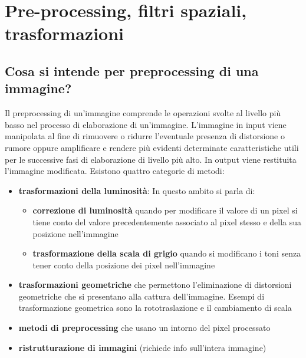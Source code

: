\chapter{Pre-processing, filtri spaziali, trasformazioni}

\section{Cosa si intende per preprocessing di una immagine?}
Il preprocessing di un'immagine comprende le operazioni svolte al livello più basso nel processo di elaborazione di un'immagine. L'immagine in input viene manipolata al fine di rimuovere o ridurre l'eventuale presenza di distorsione o rumore oppure amplificare e rendere più evidenti determinate caratteristiche utili per le successive fasi di elaborazione di livello più alto. In output viene restituita l'immagine modificata. Esistono quattro categorie di metodi:
\begin{itemize}
	\item \textbf{trasformazioni della luminosità}: In questo ambito si parla di:
		\begin{itemize}
			\item \textbf{correzione di luminosità} quando per modificare il valore di un pixel si tiene conto del valore precedentemente associato al pixel stesso e della sua posizione nell'immagine
			
			\item \textbf{trasformazione della scala di grigio} quando si modificano i toni senza tener conto della posizione dei pixel nell'immagine
		\end{itemize}
	
	\item \textbf{trasformazioni geometriche} che permettono l'eliminazione di distorsioni geometriche che si presentano alla cattura dell'immagine. Esempi di trasformazione geometrica sono la rototraslazione e il cambiamento di scala
	
	\item \textbf{metodi di preprocessing} che usano un intorno del pixel processato
	
	\item \textbf{ristrutturazione di immagini} (richiede info sull'intera immagine)
\end{itemize}

